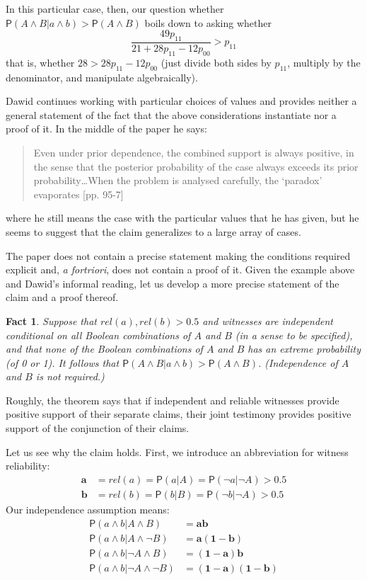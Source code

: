 \documentclass[10pt,dvipsnames,enabledeprecatedfontcommands]{scrartcl}
\newtheorem{fact}{Fact}
\newcommand{\n}{\neg}
\newcommand{\et}{\wedge}
\newcommand{\pr}[1]{\mathsf{P}(#1)}
\begin{document}
In this particular case, then, our question whether
\(\pr{A\et B\vert a\et b}>\pr{A\et B}\) boils down to asking whether
\[\frac{49p_{11}}{21+28p_{11}-12p_{00}}> p_{11}\] that is, whether
\(28 > 28 p_{11}-12p_{00}\) (just divide both sides by \(p_{11}\),
multiply by the denominator, and manipulate algebraically).

Dawid continues working with particular choices of values and provides
neither a general statement of the fact that the above considerations
instantiate nor a proof of it. In the middle of the paper he says:

\begin{quote}
 Even under prior dependence, the combined support is always positive, in the sense that the posterior probability of the case always exceeds its prior probability\dots When the problem is analysed carefully, the `paradox' evaporates [pp. 95-7]\end{quote}

\noindent where he still means the case with the particular values that
he has given, but he seems to suggest that the claim generalizes to a
large array of cases.

The paper does not contain a precise statement making the conditions
required explicit and, \emph{a fortriori}, does not contain a proof of
it. Given the example above and Dawid's informal reading, let us develop
a more precise statement of the claim and a proof thereof.

\begin{fact}\label{ther:increase}
Suppose that  $rel(a),rel(b)>0.5$ and witnesses are independent conditional on all Boolean combinations of $A$ and $B$  (in a sense to be specified), and that none of the Boolean combinations of $A$ and $B$ has an extreme probability (of 0 or 1). It follows that  $\pr{A\et B \vert a\et b}>\pr{A\et B}$. (Independence of $A$ and $B$ is not required.)
\end{fact}

Roughly, the theorem says that if independent and reliable witnesses
provide positive support of their separate claims, their joint testimony
provides positive support of the conjunction of their claims.

Let us see why the claim holds. First, we introduce an abbreviation for
witness reliability:
\begin{align*}\mathbf{a} &=rel(a)=\pr{a\vert A}=\pr{\n a\vert \n A}>0.5\\ 
\mathbf{b} &=rel(b)=\pr{b\vert B}=\pr{\n b\vert \n A}>0.5
\end{align*} Our independence assumption means: \begin{align*}
\pr{a\et b \vert A\et B}  &= \mathbf{ab}\\
\pr{a\et b \vert A\et \n B} & = \mathbf{a(1-b)}\\
\pr{a\et b \vert \n A\et B}  & = \mathbf{(1-a)b}\\
\pr{a\et b \vert \n A\et \n  B}  & = \mathbf{(1-a)(1-b)}
\end{align*}
\end{document}
